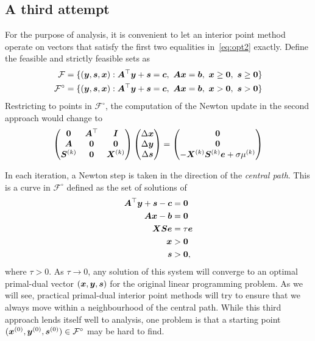 \subsection{A third attempt}
For the purpose of analysis, it is convenient to let an interior point method operate on vectors that satisfy the first two equalities in~\eqref{eq:opt2} exactly. Define the feasible and strictly feasible sets as
\begin{align*}
 \mathcal{F} &= \{(\vct{y},\vct{s},\vct{x}) \mid \mtx{A}^{\trans}\vct{y}+\vct{s}=\vct{c}, \ \mtx{A}\vct{x}=\vct{b}, \ \vct{x}\geq \zerovct, \ \vct{s}\geq \zerovct\}\\
 \mathcal{F}^{\circ} &= \{(\vct{y},\vct{s},\vct{x}) \mid \mtx{A}^{\trans}\vct{y}+\vct{s}=\vct{c}, \ \mtx{A}\vct{x}=\vct{b}, \ \vct{x}> \zerovct, \ \vct{s}> \zerovct\}\\
\end{align*}
Restricting to points in $\mathcal{F}^{\circ}$, the computation of the Newton update in the second approach would change to
\begin{equation*}
 \begin{pmatrix}
  \bm{0} & \bm{A}^{\top} & \bm{I} \\
  \bm{A} & \bm{0} & \bm{0} \\
  \bm{S}^{(k)} & \bm{0} & \bm{X}^{(k)}
 \end{pmatrix}
\begin{pmatrix} \Delta\bm{x}\\ \Delta \bm{y}\\ \Delta\bm{s} \end{pmatrix} = \begin{pmatrix} \bm{0} \\ \bm{0} \\ -\bm{X}^{(k)}\bm{S}^{(k)}\bm{e}+\sigma \mu^{(k)}\end{pmatrix}
\end{equation*}

In each iteration, a Newton step is taken in the direction of the {\em central path}. This is a curve in $\mathcal{F}^{\circ}$ defined as the set of solutions of
\begin{align}\label{eq:cpopt}
 \begin{split}
  \bm{A}^{\top}\bm{y}+\bm{s}-\bm{c} &= \bm{0}\\
  \bm{A}\bm{x}-\bm{b} & = \bm{0}\\
  \bm{X}\bm{S}\bm{e} &= \tau \bm{e}\\
  \bm{x}&> \bm{0}\\
  \bm{s}&> \bm{0},
 \end{split}
\end{align}
where $\tau>0$. As $\tau\to 0$, any solution of this system will converge to an optimal primal-dual vector $(\bm{x},\bm{y},\bm{s})$ for the original linear programming problem. As we will see, practical primal-dual interior point methods will try to ensure that we always move within a neighbourhood of the central path. While this third approach lends itself well to analysis, one problem is that a starting point $(\bm{x}^{(0)},\bm{y}^{(0)},\bm{s}^{(0)})\in \mathcal{F}^{\circ}$ may be hard to find.



